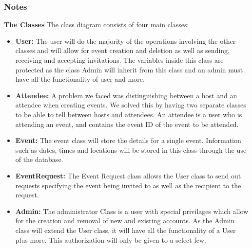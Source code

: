\documentclass[a4paper]{article}
\begin{document}
\subsubsection{Notes}
\textbf{The Classes}
The class diagram consists of four main classes:
\begin{itemize}
    \item \textbf{User:} The user will do the majority of the operations involving the other classes and will allow for event creation and deletion as well as sending, receiving and accepting invitations. The variables inside this class are protected as the class Admin will inherit from this class and an admin must have all the functionality of user and more.
    \item \textbf{Attendee:} A problem we faced was distinguishing between a host and an attendee when creating events. We solved this by having two separate classes to be able to tell between hosts and attendees. An attendee is a user who is attending an event, and contains the event ID of the event to be attended.
    \item \textbf{Event:} The event class will store the details for a single event. Information such as dates, times and locations will be stored in this class through the use of the database.
    \item \textbf{EventRequest:} The Event Request class allows the User class to send out requests specifying the event being invited to as well as the recipient to the request.
    \item \textbf{Admin:} The administrator Class is a user with special privilages which allow for the creation and removal of new and existing accounts. As the Admin class will extend the User class, it will have all the functionality of a User plus more. This authorization will only be given to a select few.
\end{itemize}
\end{document}
